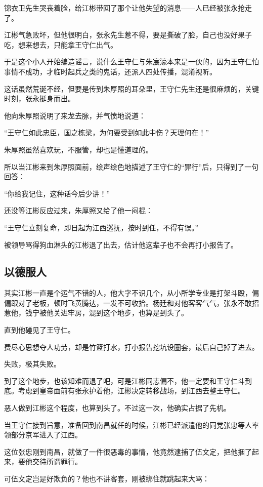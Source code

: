 \begin{multicols}{\theparacolNo}
		锦衣卫先生哭丧着脸，给江彬带回了那个让他失望的消息——人已经被张永抢走了。

		江彬气急败坏，但他很明白，张永先生惹不得，要是撕破了脸，自己也没好果子吃，想来想去，只能拿王守仁出气。

		于是这个小人开始编造谣言，说什么王守仁与朱宸濠本来是一伙的，因为王守仁怕事情不成功，才临时起兵之类的鬼话，还派人四处传播，混淆视听。

		这话虽然荒诞不经，但要是传到朱厚照的耳朵里，王守仁先生还是很麻烦的，关键时刻，张永挺身而出。

		他向朱厚照说明了来龙去脉，并气愤地说道：

		“王守仁如此忠臣，国之栋梁，为何要受到如此中伤？天理何在！”

		朱厚照虽然喜欢玩，不服管，却也是懂道理的。

		所以当江彬来到朱厚照面前，绘声绘色地描述了王守仁的“罪行”后，只得到了一句回答：

		“你给我记住，这种话今后少讲！”

		还没等江彬反应过来，朱厚照又给了他一闷棍：

		“王守仁立刻复命，即日起为江西巡抚，按时到任，不得有误。”

		被领导骂得狗血淋头的江彬退了出去，估计他这辈子也不会再打小报告了。

		\subsection{以德服人}
		其实江彬一直是个运气不错的人，他大字不识几个，从小所学专业是打架斗殴，偏偏跟对了老板，顿时飞黄腾达，一发不可收拾。杨廷和对他客客气气，张永不敢招惹他，钱宁被他关进牢房，混到这个地步，也算是到头了。

		直到他碰见了王守仁。

		费尽心思想夺人功劳，却是竹篮打水，打小报告挖坑设圈套，最后自己掉了进去。

		失败，极其失败。

		到了这个地步，也该知难而退了吧，可是江彬同志偏不，他一定要和王守仁斗到底。考虑到皇帝面前有张永护着他，江彬决定转移战场，到江西去整王守仁。

		恶人做到江彬这个程度，也算到头了。不过这一次，他确实占据了先机。

		当王守仁接到旨意，准备回到南昌就任的时候，江彬已经派遣他的同党张忠等人率领部分京军进入了江西。

		这位张忠刚到南昌，就做了一件很恶毒的事情，他竟然逮捕了伍文定，把他捆了起来，要他交待所谓罪行。

		可伍文定岂是好欺负的？他也不讲客套，刚被绑住就跳起来大骂：


\end{multicols}
